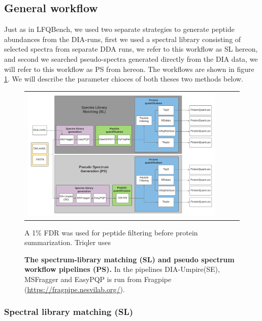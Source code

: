 \documentclass[10pt,letterpaper]{article}
\begin{document}
\subsection*{General workflow}

Just as in LFQBench, we used two separate strategies to generate peptide abundances from the DIA-runs, first we used a spectral library consisting of selected spectra from separate DDA runs, we refer to this workflow as SL hereon, and second we searched pseudo-spectra generated directly from the DIA data, we will refer to this workflow as PS from hereon. The workflows are shown in figure \ref{fig:flowchart}. We will describe the parameter chioces of both theses two methods below.

\begin{figure}[htp]
    \centering
    \begin{tabular}{lclc} 


        \includegraphics[width=1.0\linewidth]{../../result/report_plots/DIA_benchmark_truncated.png} 
    \end{tabular}

        \caption{{\bf The spectrum-library matching (SL) and pseudo spectrum workflow pipelines (PS).} In the pipelines DIA-Umpire(SE), MSFragger and EasyPQP is run from Fragpipe (\protect\url{https://fragpipe.nesvilab.org/}).} A 1\% FDR was used for peptide filtering before protein summarization. Triqler uses 
      \label{fig:flowchart}
\end{figure}



\subsubsection*{Spectral library matching (SL)}
\end{document}
